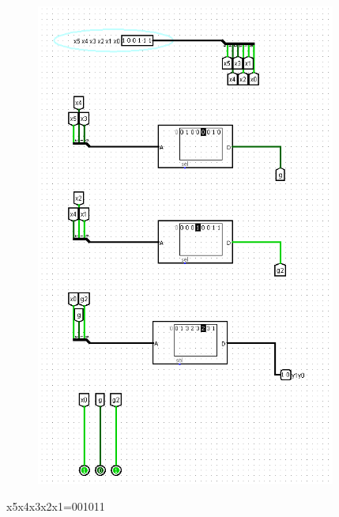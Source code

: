 \documentclass[]{article}
\begin{document}
\begin{figure}[H]
	\centering
	\includegraphics[width=0.88\textwidth]{test3_100111.png}
\end{figure}
\newpage
x5x4x3x2x1=001011
\end{document}
